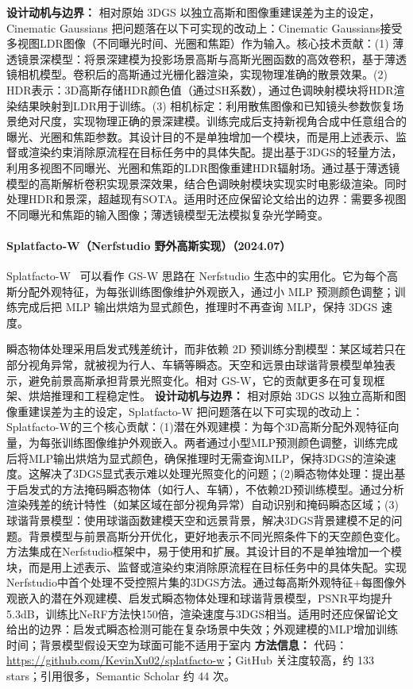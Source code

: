 \textbf{设计动机与边界：} 相对原始 3DGS 以独立高斯和图像重建误差为主的设定，Cinematic Gaussians 把问题落在以下可实现的改动上：Cinematic Gaussians接受多视图LDR图像（不同曝光时间、光圈和焦距）作为输入。核心技术贡献：(1) 薄透镜景深模型：将景深建模为投影场景高斯与高斯光圈函数的高效卷积，基于薄透镜相机模型。卷积后的高斯通过光栅化器渲染，实现物理准确的散景效果。(2) HDR表示：3D高斯存储HDR颜色值（通过SH系数），通过色调映射模块将HDR渲染结果映射到LDR用于训练。(3) 相机标定：利用散焦图像和已知镜头参数恢复场景绝对尺度，实现物理正确的景深建模。训练完成后支持新视角合成中任意组合的曝光、光圈和焦距参数。其设计目的不是单独增加一个模块，而是用上述表示、监督或渲染约束消除原流程在目标任务中的具体失配。提出基于3DGS的轻量方法，利用多视图不同曝光、光圈和焦距的LDR图像重建HDR辐射场。通过基于薄透镜模型的高斯解析卷积实现景深效果，结合色调映射模块实现实时电影级渲染。同时处理HDR和景深，超越现有SOTA。适用时还应保留论文给出的边界：需要多视图不同曝光和焦距的输入图像；薄透镜模型无法模拟复杂光学畸变。
\paragraph{Splatfacto-W（Nerfstudio 野外高斯实现）（2024.07）}
Splatfacto-W~\cite{2407_12306} 可以看作 GS-W 思路在 Nerfstudio 生态中的实用化。它为每个高斯分配外观特征，为每张训练图像维护外观嵌入，通过小 MLP 预测颜色调整；训练完成后把 MLP 输出烘焙为显式颜色，推理时不再查询 MLP，保持 3DGS 速度。

瞬态物体处理采用启发式残差统计，而非依赖 2D 预训练分割模型：某区域若只在部分视角异常，就被视为行人、车辆等瞬态。天空和远景由球谐背景模型单独表示，避免前景高斯承担背景光照变化。相对 GS-W，它的贡献更多在可复现框架、烘焙推理和工程稳定性。
\textbf{设计动机与边界：} 相对原始 3DGS 以独立高斯和图像重建误差为主的设定，Splatfacto-W 把问题落在以下可实现的改动上：Splatfacto-W的三个核心贡献：(1)潜在外观建模：为每个3D高斯分配外观特征向量，为每张训练图像维护外观嵌入。两者通过小型MLP预测颜色调整，训练完成后将MLP输出烘焙为显式颜色，确保推理时无需查询MLP，保持3DGS的渲染速度。这解决了3DGS显式表示难以处理光照变化的问题；(2)瞬态物体处理：提出基于启发式的方法掩码瞬态物体（如行人、车辆），不依赖2D预训练模型。通过分析渲染残差的统计特性（如某区域在部分视角异常）自动识别和掩码瞬态区域；(3)球谐背景模型：使用球谐函数建模天空和远景背景，解决3DGS背景建模不足的问题。背景模型与前景高斯分开优化，更好地表示不同光照条件下的天空颜色变化。方法集成在Nerfstudio框架中，易于使用和扩展。其设计目的不是单独增加一个模块，而是用上述表示、监督或渲染约束消除原流程在目标任务中的具体失配。实现Nerfstudio中首个处理不受控照片集的3DGS方法。通过每高斯外观特征+每图像外观嵌入的潜在外观建模、启发式瞬态物体处理和球谐背景模型，PSNR平均提升5.3dB，训练比NeRF方法快150倍，渲染速度与3DGS相当。适用时还应保留论文给出的边界：启发式瞬态检测可能在复杂场景中失效；外观建模的MLP增加训练时间；背景模型假设天空为球面可能不适用于室内
\textbf{方法信息：} 代码：\url{https://github.com/KevinXu02/splatfacto-w}；GitHub 关注度较高，约 133 stars；引用很多，Semantic Scholar 约 44 次。



